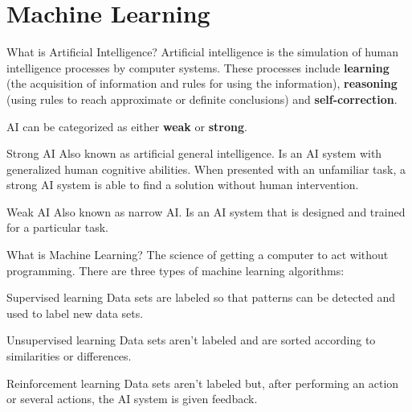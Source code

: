 \section{Machine Learning}
\begin{frame}{What is Artificial Intelligence?}
    Artificial intelligence is the simulation of human intelligence processes by computer systems. These processes include \textbf{learning} (the acquisition of information and rules for using the information), \textbf{reasoning} (using rules to reach approximate or definite conclusions) and \textbf{self-correction}.

    \pause

    AI can be categorized as either \textbf{weak} or \textbf{strong}.

    \pause

    \begin{block}{Strong AI}
		Also known as artificial general intelligence. Is an AI system with generalized human cognitive abilities. When presented with an unfamiliar task, a strong AI system is able to find a solution without human intervention.
    \end{block}

    \pause

    \begin{block}{Weak AI}
		Also known as narrow AI. Is an AI system that is designed and trained for a particular task.
    \end{block}
\end{frame}

\begin{frame}{What is Machine Learning?}
    The science of getting a computer to act without programming. There are three types of machine learning algorithms:

    \pause

    \begin{block}{Supervised learning}
        Data sets are labeled so that patterns can be detected and used to label new data sets.
    \end{block}

    \pause

    \begin{block}{Unsupervised learning}
        Data sets aren't labeled and are sorted according to similarities or differences.
    \end{block}

    \pause

    \begin{block}{Reinforcement learning}
        Data sets aren't labeled but, after performing an action or several actions, the AI system is given feedback.
    \end{block}
\end{frame}


